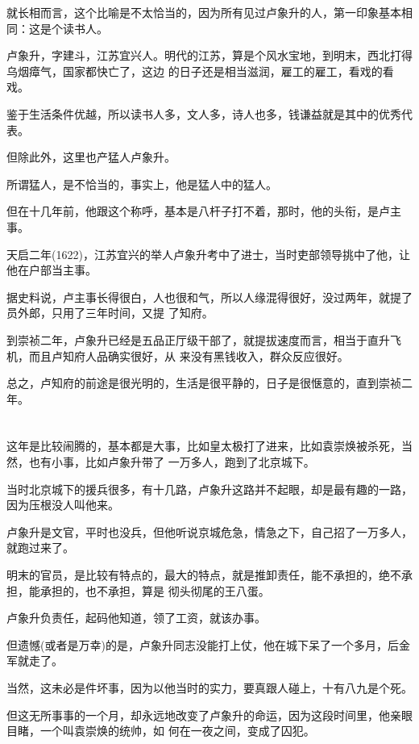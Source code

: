 \documentclass[11pt,a4paper,onecolumn]{article}
\begin{document}
就长相而言，这个比喻是不太恰当的，因为所有见过卢象升的人，第一印象基本相同：这是个读书人。

卢象升，字建斗，江苏宜兴人。明代的江苏，算是个风水宝地，到明末，西北打得乌烟瘴气，国家都快亡了，这边
的日子还是相当滋润，雇工的雇工，看戏的看戏。

鉴于生活条件优越，所以读书人多，文人多，诗人也多，钱谦益就是其中的优秀代表。

但除此外，这里也产猛人\myrule 卢象升。

所谓猛人，是不恰当的，事实上，他是猛人中的猛人。

但在十几年前，他跟这个称呼，基本是八杆子打不着，那时，他的头衔，是卢主事。

天启二年(1622)，江苏宜兴的举人卢象升考中了进士，当时吏部领导挑中了他，让他在户部当主事。

据史料说，卢主事长得很白，人也很和气，所以人缘混得很好，没过两年，就提了员外郎，只用了三年时间，又提
了知府。

到崇祯二年，卢象升已经是五品正厅级干部了，就提拔速度而言，相当于直升飞机，而且卢知府人品确实很好，从
来没有黑钱收入，群众反应很好。

总之，卢知府的前途是很光明的，生活是很平静的，日子是很惬意的，直到崇祯二年。

\section[\thesection]{}

这年是比较闹腾的，基本都是大事，比如皇太极打了进来，比如袁崇焕被杀死，当然，也有小事，比如卢象升带了
一万多人，跑到了北京城下。

当时北京城下的援兵很多，有十几路，卢象升这路并不起眼，却是最有趣的一路，因为压根没人叫他来。

卢象升是文官，平时也没兵，但他听说京城危急，情急之下，自己招了一万多人，就跑过来了。

明末的官员，是比较有特点的，最大的特点，就是推卸责任，能不承担的，绝不承担，能承担的，也不承担，算是
彻头彻尾的王八蛋。

卢象升负责任，起码他知道，领了工资，就该办事。

但遗憾(或者是万幸)的是，卢象升同志没能打上仗，他在城下呆了一个多月，后金军就走了。

当然，这未必是件坏事，因为以他当时的实力，要真跟人碰上，十有八九是个死。

但这无所事事的一个月，却永远地改变了卢象升的命运，因为这段时间里，他亲眼目睹，一个叫袁崇焕的统帅，如
何在一夜之间，变成了囚犯。
\end{document}
